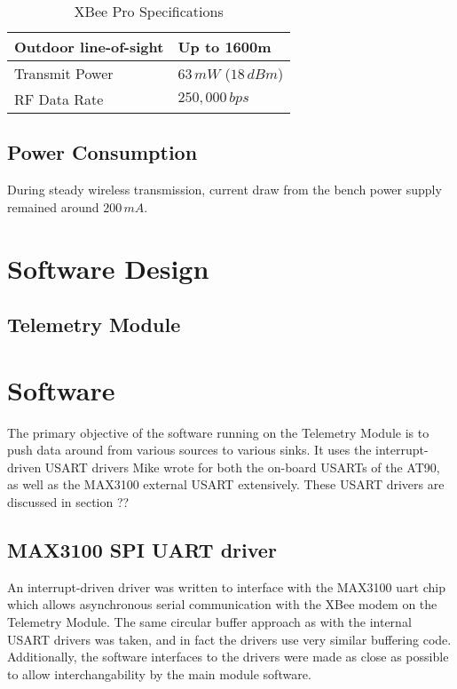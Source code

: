 %
\begin{table}
\centering{}\caption{XBee Pro Specifications}
\begin{tabular}{|l|l|}
\hline 
Outdoor line-of-sight  & Up to 1600m\tabularnewline
\hline 
Transmit Power  & $63\, mW$ ($18\, dBm$)\tabularnewline
\hline 
RF Data Rate  & $250,000\, bps$\tabularnewline
\hline
\end{tabular}
\end{table}

\subsection{Power Consumption}

During steady wireless transmission, current draw from the bench power
supply remained around $200\, mA$.

\section{Software Design}

\subsection{Telemetry Module}

\section{Software}

The primary objective of the software running on the Telemetry Module
is to push data around from various sources to various sinks. It uses
the interrupt-driven USART drivers Mike wrote for both the on-board
USARTs of the AT90, as well as the MAX3100 external USART extensively.
These USART drivers are discussed in section ?? %

\subsection{MAX3100 SPI UART driver}

An interrupt-driven driver was written to interface with the MAX3100
uart chip which allows asynchronous serial communication with the
XBee modem on the Telemetry Module. The same circular buffer approach
as with the internal USART drivers was taken, and in fact the drivers
use very similar buffering code. Additionally, the software interfaces
to the drivers were made as close as possible to allow interchangability
by the main module software.

